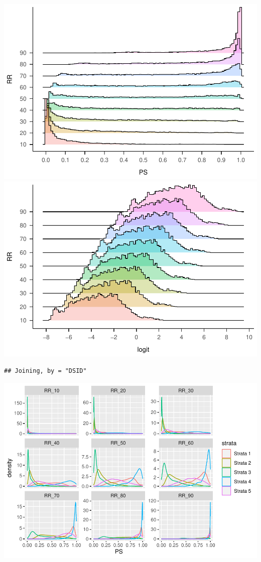 \documentclass[
  english,
  man,floatsintext]{apa6}
\begin{document}
\includegraphics{5---Analysis_files/figure-latex/unnamed-chunk-14-1.pdf} \includegraphics{5---Analysis_files/figure-latex/unnamed-chunk-14-2.pdf}

\begin{verbatim}
## Joining, by = "DSID"
\end{verbatim}

\includegraphics{5---Analysis_files/figure-latex/unnamed-chunk-15-1.pdf}
\end{document}
